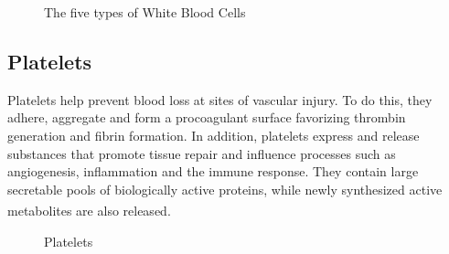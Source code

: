 \vspace{0.1in}

\begin{figure}[H]
\centering
  \vspace{-0.1in}
    \centerline{}
    \caption{The five types of White Blood Cells}
\end{figure}

\subsection{Platelets}

Platelets help prevent blood loss at sites of vascular injury. To do this, they adhere, aggregate and form a procoagulant surface favorizing thrombin generation and fibrin formation. In addition, platelets express and release substances that promote tissue repair and influence processes such as angiogenesis, inflammation and the immune response. They contain large secretable pools of biologically active proteins, while newly synthesized active metabolites are also released. \textsuperscript{\cite{nurden2008platelets}}

\vspace{0.2in}

\begin{figure}[h]
\centering
  \vspace{-0.1in}
    \centerline{}
    \caption{Platelets}
\end{figure}
